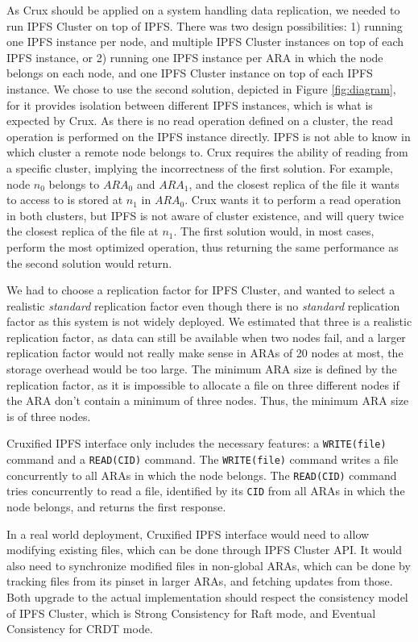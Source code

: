 \documentclass[a4paper,11pt,oneside]{report}
\begin{document}
As Crux should be applied on a system handling data replication, we needed to run IPFS Cluster on top of IPFS. There was two design possibilities: 1) running one IPFS instance per node, and multiple IPFS Cluster instances on top of each IPFS instance, or 2) running one IPFS instance per ARA in which the node belongs on each node, and one IPFS Cluster instance on top of each IPFS instance. We chose to use the second solution, depicted in Figure \ref{fig:diagram}, for it provides isolation between different IPFS instances, which is what is expected by Crux. As there is no read operation defined on a cluster, the read operation is performed on the IPFS instance directly. IPFS is not able to know in which cluster a remote node belongs to. Crux requires the ability of reading from a specific cluster, implying the incorrectness of the first solution. For example, node $n_0$ belongs to $ARA_0$ and $ARA_1$, and the closest replica of the file it wants to access to is stored at $n_1$ in $ARA_0$. Crux wants it to perform a read operation in both clusters, but IPFS is not aware of cluster existence, and will query twice the closest replica of the file at $n_1$. The first solution would, in most cases, perform the most optimized operation, thus returning the same performance as the second solution would return.

We had to choose a replication factor for IPFS Cluster, and wanted to select a realistic \textit{standard} replication factor even though there is no \textit{standard} replication factor as this system is not widely deployed. We estimated that three is a realistic replication factor, as data can still be available when two nodes fail, and a larger replication factor would not really make sense in ARAs of 20 nodes at most, the storage overhead would be too large. The minimum ARA size is defined by the replication factor, as it is impossible to allocate a file on three different nodes if the ARA don't contain a minimum of three nodes. Thus, the minimum ARA size is of three nodes.

Cruxified IPFS interface only includes the necessary features: a \texttt{WRITE(file)} command and a \texttt{READ(CID)} command. The \texttt{WRITE(file)} command writes a file concurrently to all ARAs in which the node belongs. The \texttt{READ(CID)} command tries concurrently to read a file, identified by its \texttt{CID} from all ARAs in which the node belongs, and returns the first response.

In a real world deployment, Cruxified IPFS interface would need to allow modifying existing files, which can be done through IPFS Cluster API. It would also need to synchronize modified files in non-global ARAs, which can be done by tracking files from its pinset in larger ARAs, and fetching updates from those. Both upgrade to the actual implementation should respect the consistency model of IPFS Cluster, which is Strong Consistency for Raft mode, and Eventual Consistency for CRDT mode.
\end{document}
